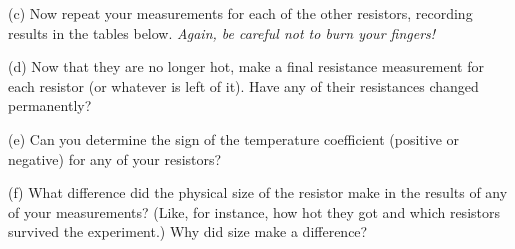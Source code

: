 (c) Now repeat your measurements for each of the other resistors, recording results in the tables below.  \textit{Again, be careful not to burn your fingers!}

\maketableforivmeasurements

\maketableforivmeasurements

\maketableforivmeasurements


(d) Now that they are no longer hot, make a final resistance measurement for each resistor (or whatever is left of it).  Have any of their resistances changed permanently?
\answerspace{1.0in}

(e) Can you determine the sign of the temperature coefficient (positive or negative) for any of your resistors?
\answerspace{1.0in}


(f) What difference did the physical size of the resistor make in the results of any of your measurements?  (Like, for instance, how hot they got and which resistors survived the experiment.)  Why did size make a difference?
\answerspace{1.0in}







